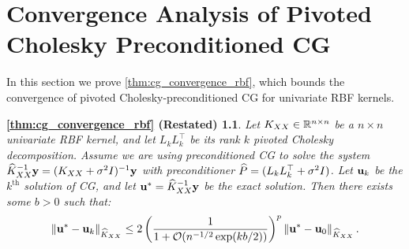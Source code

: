 \chapter{Convergence Analysis of Pivoted Cholesky Preconditioned CG}
\label{app:theory}

In this section we prove \autoref{thm:cg_convergence_rbf}, which bounds the convergence of pivoted Cholesky-preconditioned CG for univariate RBF kernels.
%
\newtheorem*{thm:cg_convergence_rbf}{\autoref{thm:cg_convergence_rbf} (Restated)}
\begin{thm:cg_convergence_rbf}
  Let $K_{XX} \in \mathbb{R}^{n \times n}$ be a $n \times n$ univariate RBF kernel, and let $L_k L_k^\top$ be its rank $k$ pivoted Cholesky decomposition.
  Assume we are using preconditioned CG to solve the system $\widehat{K}_{XX}^{-1} \mathbf{y} = (K_{XX} + \sigma^2 I)^{-1} \mathbf{y}$ with preconditioner $\widehat{P} = (L_k L_k^\top + \sigma^2 I)$.
  Let $\mathbf{u}_k$ be the $k^\textrm{th}$ solution of CG, and let $\mathbf{u}^{*} = \widehat{K}_{XX}^{-1} \mathbf{y}$ be the exact solution.
  Then there exists some $b > 0$ such that:
  \begin{equation}
    \Vert \bu^{*} - \bu_{k} \Vert_{\trainK}
    \leq 2 \left(\frac{1}{1 + \bigo{n^{-1/2} \exp(kb/2)}}\right)^{p} \left\Vert \bu^{*} - \bu_{0} \right\Vert_{\trainK}.
  \end{equation}
\end{thm:cg_convergence_rbf}

